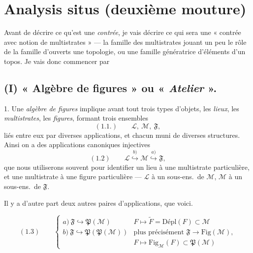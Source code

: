 \documentclass[11pt,a4paper]{article}
\begin{document}
\section{Analysis situs (deuxième mouture)}



Avant de décrire ce qu'est une \emph{contrée}, je vais décrire ce qui sera une « contrée avec notion de multistrates » — la famille des multistrates  jouant un peu le rôle de la famille d'ouverts    une topologie, ou une famille génératrice d'éléments d'un topos. Je vais donc commencer par

\subsection{(I) « Algèbre de figures » ou « \emph{Atelier} ».}

1. Une \emph{algèbre de figures} implique avant tout trois types d'objets, les \emph{lieux}, les \emph{multistrates}, les \emph{figures}, formant trois ensembles
\[
  (1.1.) \qquad \mathcal{L},\ \mathcal{M},\ \mathfrak{F} ,
\]
liés entre eux par diverses applications, et chacun muni de diverses structures. Ainsi on a des applications canoniques injectives
\[
  (1.2) \qquad \mathcal{L} \overset{b)}{\hookrightarrow} \mathcal{M} \overset{a)}{\hookrightarrow} \mathfrak{F} ,
\]
que nous utiliserons souvent pour identifier un lieu à une multistrate particulière, et une multistrate à une figure particulière — $\mathcal{L}$ à un sous-ens.\ de $\mathcal{M}$, $\mathcal{M}$ à un sous-ens.\ de $\mathfrak{F}$.

Il y a d'autre part deux autres paires d'applications, que voici.

\[
  (1.3) \qquad
  \begin{cases}
    a)\ \mathfrak{F} \hookrightarrow \mathfrak{P}(\mathcal{M}) & F \mapsto \widetilde{F} = \mathrm{Dépl}(F) \subset \mathcal{M} \\
    b)\ \mathfrak{F} \hookrightarrow \mathfrak{P}(\mathfrak{P}(\mathcal{M})) & \text{plus précisément } \mathfrak{F} \to \mathrm{Fig}(\mathcal{M}), \\
     & F \mapsto \mathrm{Fig}_{\mathcal{M}}(F) \subset \mathfrak{P}(\mathcal{M})
  \end{cases}
\]
\marginal{\ill{} \ill{}}
\end{document}
